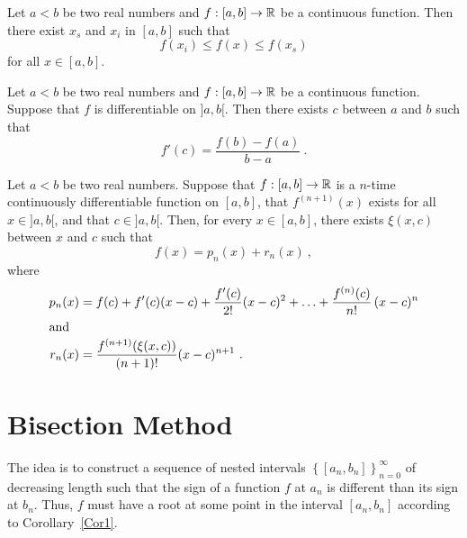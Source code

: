 \begin{theorem}
Let $a<b$ be two real numbers and $f:[a,b] \rightarrow \mathbb{R}$ be a
continuous function.  Then there exist $x_s$ and $x_i$ in $[a,b]$ such
that
\[
f(x_i) \leq f(x) \leq f(x_s)
\]
for all $x \in [a,b]$.
\label{Th2}
\end{theorem}

\begin{theorem} \label{Th3}
Let $a<b$ be two real numbers and $f:[a,b] \rightarrow \mathbb{R}$ be a
continuous function.  Suppose that $f$ is differentiable on $]a,b[$.
Then there exists $c$ between $a$ and $b$ such that
\[
f'(c)=\frac{f(b)-f(a)}{b-a} \ .
\]
\end{theorem}

\begin{theorem}
Let $a<b$ be two real numbers.  Suppose that $f:[a,b] \rightarrow \mathbb{R}$
is a $n$-time continuously differentiable function on $[a,b]$, that
$f^{(n+1)}(x)$ exists for all $x \in ]a,b[$, and that
$c \in ]a,b[$.  Then, for every $x \in [a,b]$, there exists $\xi(x,c)$
between $x$ and $c$ such that
\[
f(x) = p_n(x) + r_n(x) \ ,
\]
where
\begin{align*}
p_n(x) &= f(c) + f'(c)(x-c) + \frac{f'(c)}{2!}(x-c)^2 + \ldots
+ \frac{f^{(n)}(c)}{n!} \, (x-c)^n\\
\intertext{and}
r_n(x) &= \frac{f^{(n+1)}(\xi(x,c))}{(n+1)!}(x-c)^{n+1} \ .
\end{align*}
\label{TaylorTheo}
\end{theorem}

\section{Bisection Method}

The idea is to construct a sequence of nested intervals
$\displaystyle \left\{ [a_n,b_n] \right\}_{n=0}^\infty$ of decreasing
length such that the sign of a function $f$ at $a_n$ is different than
its sign at $b_n$.  Thus, $f$ must have a root at some point in the
interval $[a_n,b_n]$ according to Corollary~\ref{Cor1}.


